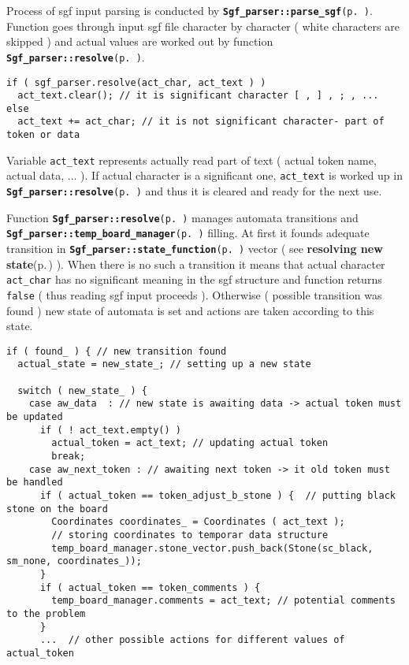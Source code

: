 Process of sgf input parsing is conducted by {\tt {\bf Sgf\_\-parser::parse\_\-sgf}{\rm (p.\,\pageref{classSgf__parser_a5})}}. Function goes through input sgf file character by character ( white characters are skipped ) and actual values are worked out by function {\tt {\bf Sgf\_\-parser::resolve}{\rm (p.\,\pageref{classSgf__parser_a4})}}.



\footnotesize\begin{verbatim}if ( sgf_parser.resolve(act_char, act_text ) ) 
  act_text.clear(); // it is significant character [ , ] , ; , ... 
else              
  act_text += act_char; // it is not significant character- part of token or data 
\end{verbatim}
\normalsize


Variable {\tt act\_\-text} represents actually read part of text ( actual token name, actual data, ... ). If actual character is a significant one, {\tt act\_\-text} is worked up in {\tt {\bf Sgf\_\-parser::resolve}{\rm (p.\,\pageref{classSgf__parser_a4})}} and thus it is cleared and ready for the next use.

Function {\tt {\bf Sgf\_\-parser::resolve}{\rm (p.\,\pageref{classSgf__parser_a4})}} manages automata transitions and {\tt {\bf Sgf\_\-parser::temp\_\-board\_\-manager}{\rm (p.\,\pageref{classSgf__parser_r12})}} filling. At first it founds adequate transition in {\tt {\bf Sgf\_\-parser::state\_\-function}{\rm (p.\,\pageref{classSgf__parser_r1})}} vector ( see {\bf resolving new state}{\rm (p.\,\pageref{page_5_page_5__resolving_new_state})} ). When there is no such a transition it means that actual character {\tt act\_\-char} has no significant meaning in the sgf structure and function returns {\tt false} ( thus reading sgf input proceeds ). Otherwise ( possible transition was found ) new state of automata is set and actions are taken according to this state.



\footnotesize\begin{verbatim}if ( found_ ) { // new transition found
  actual_state = new_state_; // setting up a new state 

  switch ( new_state_ ) {
    case aw_data  : // new state is awaiting data -> actual token must be updated
      if ( ! act_text.empty() ) 
        actual_token = act_text; // updating actual token
        break;
    case aw_next_token : // awaiting next token -> it old token must be handled
      if ( actual_token == token_adjust_b_stone ) {  // putting black stone on the board
        Coordinates coordinates_ = Coordinates ( act_text ); 
        // storing coordinates to temporar data structure
        temp_board_manager.stone_vector.push_back(Stone(sc_black, sm_none, coordinates_));
      } 
      if ( actual_token == token_comments ) {
        temp_board_manager.comments = act_text; // potential comments to the problem
      }
      ...  // other possible actions for different values of actual_token 
\end{verbatim}
\normalsize


